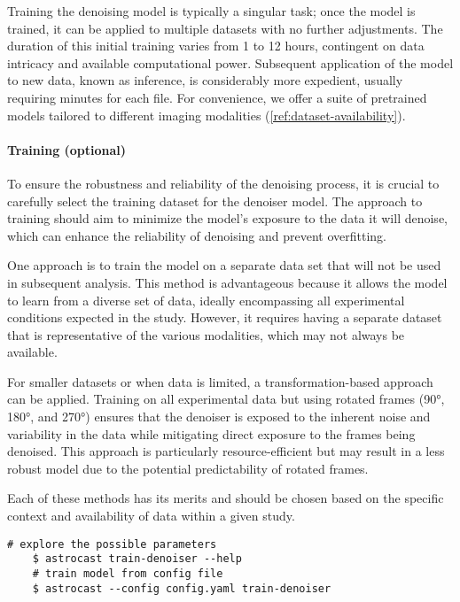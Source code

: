 Training the denoising model is typically a singular task; once the model is trained, it can be applied to multiple datasets with no further adjustments. The duration of this initial training varies from 1 to 12 hours, contingent on data intricacy and available computational power. Subsequent application of the model to new data, known as inference, is considerably more expedient, usually requiring minutes for each file. For convenience, we offer a suite of pretrained models tailored to different imaging modalities (\ref{ref:dataset-availability}).

\paragraph{Training (optional)}

To ensure the robustness and reliability of the denoising process, it is crucial to carefully select the training dataset for the denoiser model. The approach to training should aim to minimize the model's exposure to the data it will denoise, which can enhance the reliability of denoising and prevent overfitting.

One approach is to train the model on a separate data set that will not be used in subsequent analysis. This method is advantageous because it allows the model to learn from a diverse set of data, ideally encompassing all experimental conditions expected in the study. However, it requires having a separate dataset that is representative of the various modalities, which may not always be available.

For smaller datasets or when data is limited, a transformation-based approach can be applied. Training on all experimental data but using rotated frames (90°, 180°, and 270°) ensures that the denoiser is exposed to the inherent noise and variability in the data while mitigating direct exposure to the frames being denoised. This approach is particularly resource-efficient but may result in a less robust model due to the potential predictability of rotated frames.

Each of these methods has its merits and should be chosen based on the specific context and availability of data within a given study.

\begin{lstlisting}[style=bashStyle]
    # explore the possible parameters
    $ astrocast train-denoiser --help
    # train model from config file
    $ astrocast --config config.yaml train-denoiser
\end{lstlisting}

